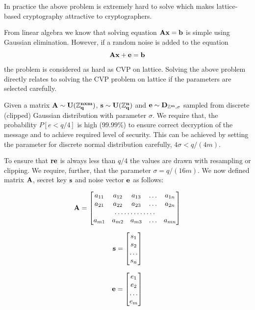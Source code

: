 In practice the above problem is extremely hard to solve which makes lattice-based cryptography 
attractive to cryptographers.

From linear algebra we know that solving equation $\bf{Ax}=\bf{b}$ is simple using
Gaussian elimination. However, if a random noise is added to the equation $$\bf{Ax} + \bf{e} = \bf{b}$$ the 
problem is considered as hard as CVP on lattice. Solving the above problem directly relates to 
solving the CVP problem on lattice if the parameters are selected carefully.

Given a matrix $\bf{A} \sim U(\mathbb{Z}^{nxm}_q)$, $\bf{s} \sim U(\mathbb{Z}^{n}_q)$ and $\bf{e} \sim D_{\mathbb{Z}^{m}, \sigma}$ 
sampled from discrete (clipped) Gaussian distribution with parameter $\sigma$. We require that, the probability
$P[e < q/4]$ is high (\ie $99.99\%$) to ensure correct decryption of the message and to achieve required 
level of security. This can be achieved by setting the parameter for discrete normal distribution carefully, \ie $4\sigma < q/(4m)$.

To ensure that $\bf{re}$ is always less than $q/4$ the values are drawn with resampling
or clipping. We require, further, that the parameter $\sigma = q/(16m)$. We now defined 
matrix ${\bf A}$, secret key ${\bf s}$ and noise vector ${\bf e}$ as follows:

\begin{equation}
    {\bf A}=\begin{bmatrix}
        a_{11}       & a_{12} & a_{13} & \dots & a_{1n} \\
        a_{21}       & a_{22} & a_{23} & \dots & a_{2n} \\
        \hdotsfor{5} \\
        a_{m1}       & a_{m2} & a_{m3} & \dots & a_{mn}
    \end{bmatrix}
\end{equation}

\begin{equation}
    {\bf s}=\begin{bmatrix}
        s_{1} \\
        s_{2} \\
        \dots \\
        s_{n} 
    \end{bmatrix}
\end{equation}

\begin{equation}
    {\bf e}=\begin{bmatrix}
        e_{1} \\
        e_{2} \\
        \dots \\
        e_{m} 
    \end{bmatrix}
\end{equation}

